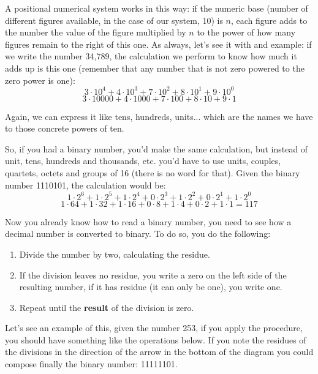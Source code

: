 \documentclass[a4paper]{article}
\begin{document}
A positional numerical system works in this way: if the numeric base (number of
different figures available, in the case of our system, 10) is $n$, each figure
adds to the number the value of the figure multiplied by $n$ to the power of
how many figures remain to the right of this one. As always, let's see it with
and example: if we write the number 34,789, the calculation we perform to
know how much it adds up is this one (remember that any number that is not zero
powered to the zero power is one):
$$
3\cdot10^4+4\cdot10^3+7\cdot10^2+8\cdot10^1+9\cdot10^0
$$
$$
3\cdot10000+4\cdot1000+7\cdot100+8\cdot10+9\cdot1
$$

Again, we can express it like tens, hundreds, units... which are the names
we have to those concrete powers of ten.

So, if you had a binary number, you'd make the same calculation, but instead of
unit, tens, hundreds and thousands, etc. you'd have to use units, couples,
quartets, octets and groups of 16 (there is no word for that). Given the binary
number 1110101, the calculation would be:
$$
1\cdot2^6+ 1\cdot2^5+1\cdot2^4+0\cdot2^3+1\cdot2^2+0\cdot2^1+1\cdot2^0
$$
$$
1\cdot64+ 1\cdot32+1\cdot16+0\cdot8+1\cdot4+0\cdot2+1\cdot1=117
$$

Now you already know how to read a binary number, you need to see how a decimal
number is converted to binary. To do so, you do the following:
\begin{enumerate}
\item Divide the number by two, calculating the residue.
\item If the division leaves no residue, you write a zero on the left side of
the resulting number, if it has residue (it can only be one), you write one.
\item Repeat until the \textbf{result} of the division is zero.
\end{enumerate}

Let's see an example of this, given the number 253, if you apply the procedure,
you should have something like the operations below. If you note the residues of
the divisions in the direction of the arrow in the bottom of the diagram you
could compose finally the binary number: 11111101.
\end{document}
